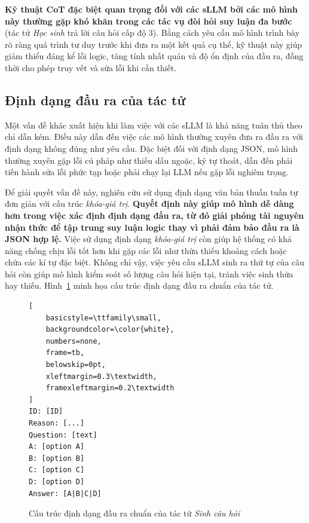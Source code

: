 \textbf{Kỹ thuật CoT đặc biệt quan trọng đối với các sLLM bởi các mô hình này thường gặp khó khăn trong các tác vụ đòi hỏi suy luận đa bước} (tác tử \textit{Học sinh} trả lời câu hỏi cấp độ 3). Bằng cách yêu cầu mô hình trình bày rõ ràng quá trình tư duy trước khi đưa ra một kết quả cụ thể, kỹ thuật này giúp giảm thiểu đáng kể lỗi logic, tăng tính nhất quán và độ ổn định của đầu ra, đồng thời cho phép truy vết và sửa lỗi khi cần thiết.

\subsection{Định dạng đầu ra của tác tử}

Một vấn đề khác xuất hiện khi làm việc với các sLLM là khả năng tuân thủ theo chỉ dẫn kém. Điều này dẫn đến việc các mô hình thường xuyên đưa ra đầu ra với định dạng không đúng như yêu cầu. Đặc biệt đối với định dạng JSON, mô hình thường xuyên gặp lỗi cú pháp như thiếu dấu ngoặc, ký tự thoát, dẫn đến phải tiến hành sửa lỗi phức tạp hoặc phải chạy lại LLM nếu gặp lỗi nghiêm trọng\cite{galeone2026correct}.

Để giải quyết vấn đề này, nghiên cứu sử dụng định dạng văn bản thuần tuần tự đơn giản với cấu trúc \textit{khóa-giá trị}. \textbf{Quyết định này giúp mô hình dễ dàng hơn trong việc xác định định dạng đầu ra, từ đó giải phóng tài nguyên nhận thức để tập trung suy luận logic thay vì phải đảm bảo đầu ra là JSON hợp lệ.} Việc sử dụng định dạng \textit{khóa-giá trị} còn giúp hệ thống có khả năng chống chịu lỗi tốt hơn khi gặp các lỗi như thừa thiếu khoảng cách hoặc chứa các kí tự đặc biệt. Không chỉ vậy, việc yêu cầu sLLM sinh ra thứ tự của câu hỏi còn giúp mô hình kiểm soát số lượng câu hỏi hiện tại, tránh việc sinh thừa hay thiếu. Hình~\ref{fig:agent_output_format} minh họa cấu trúc định dạng đầu ra chuẩn của tác tử.

\begin{figure}[htbp]
    \centering
    \begin{minipage}{0.45\textwidth}
\begin{lstlisting}[
    basicstyle=\ttfamily\small, 
    backgroundcolor=\color{white}, 
    numbers=none, 
    frame=tb, 
    belowskip=0pt,
    xleftmargin=0.3\textwidth,     
    framexleftmargin=0.2\textwidth
]
ID: [ID]
Reason: [...]
Question: [text]
A: [option A]
B: [option B]
C: [option C]
D: [option D]
Answer: [A|B|C|D]
\end{lstlisting}
    \end{minipage}
    \vspace{-0.3cm}
    \caption{Cấu trúc định dạng đầu ra chuẩn của tác tử \textit{Sinh câu hỏi}}
    \label{fig:agent_output_format}
\end{figure}